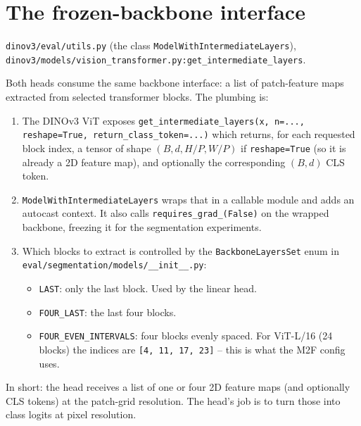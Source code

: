 \documentclass[11pt,a4paper]{article}
\begin{document}
\section{The frozen-backbone interface}
\label{sec:backbone-interface}

\begin{srcbox}
\texttt{dinov3/eval/utils.py} (the class \texttt{ModelWithIntermediateLayers}),\\
\texttt{dinov3/models/vision\_transformer.py:get\_intermediate\_layers}.
\end{srcbox}

Both heads consume the same backbone interface: a list of patch-feature maps
extracted from selected transformer blocks. The plumbing is:

\begin{enumerate}[leftmargin=1.6em,itemsep=0pt]
  \item The DINOv3 ViT exposes
        \texttt{get\_intermediate\_layers(x, n=..., reshape=True,
        return\_class\_token=...)} which returns, for each requested block
        index, a tensor of shape $(B, d, H/P, W/P)$ if \texttt{reshape=True}
        (so it is already a 2D feature map), and optionally the corresponding
        $(B, d)$ CLS token.
  \item \texttt{ModelWithIntermediateLayers} wraps that in a callable module
        and adds an autocast context. It also calls
        \texttt{requires\_grad\_(False)} on the wrapped backbone, freezing it
        for the segmentation experiments.
  \item Which blocks to extract is controlled by the
        \texttt{BackboneLayersSet} enum in
        \texttt{eval/segmentation/models/\_\_init\_\_.py}:
        \begin{itemize}[leftmargin=1.6em,itemsep=0pt]
          \item \texttt{LAST}: only the last block. Used by the linear head.
          \item \texttt{FOUR\_LAST}: the last four blocks.
          \item \texttt{FOUR\_EVEN\_INTERVALS}: four blocks evenly spaced.
                For ViT-L/16 (24 blocks) the indices are
                \texttt{[4, 11, 17, 23]} -- this is what the M2F config
                uses.
        \end{itemize}
\end{enumerate}

In short: the head receives a list of one or four 2D feature maps (and
optionally CLS tokens) at the patch-grid resolution. The head's job is to
turn those into class logits at pixel resolution.
\end{document}
